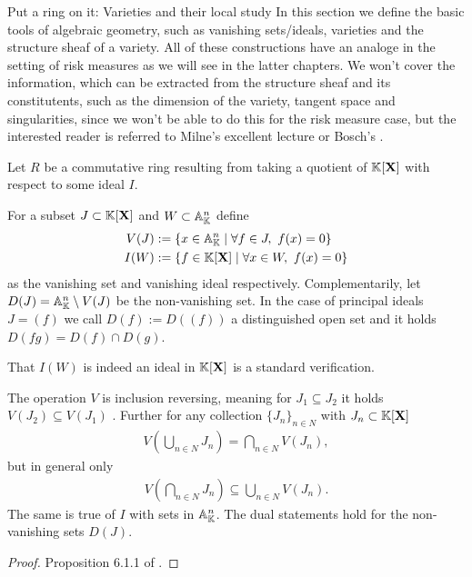 \begin{subsection}{Put a ring on it: Varieties and their local study}
    In this section we define the basic tools of algebraic geometry, such as 
    vanishing sets/ideals, varieties and the structure sheaf of a variety. 
    All of these constructions have an analoge in the setting of risk measures as we will see in the latter chapters.
    We won't cover the information, which can be extracted from the structure sheaf and its constitutents, such as the dimension
    of the variety, tangent space and singularities, since we won't be able to do this for the risk measure case, but the interested
    reader is referred to Milne's excellent lecture \cite{milne2012algebraic} or Bosch's \cite{alggeoandcom}.

    Let \( R \) be a commutative ring resulting from taking a quotient of \( \mathbb{K}[\mathbf{X}] \) with respect to some ideal \( I \).
    \begin{definition}
        For a subset \( J \subset \mathbb{K}[\mathbf{X}] \) and \( W \subset \mathbb{A}^{n}_{\mathbb{K}} \) define
        \begin{align*}
            V(J) &:= \left\{ x \in \stdaff \mid \forall f \in J,\ f(x) = 0 \right\}  \\
            I(W) &:= \left\{ f \in \stdpolyr \mid \forall x \in W,\ f(x) = 0 \right\}
        \end{align*}
        as the vanishing set and vanishing ideal respectively. Complementarily, let
        \( D(J) = \mathbb{A}^{n}_{\mathbb{K}} \setminus V(J) \) be the non-vanishing set. In the case of principal ideals \( J = (f) \)
        we call \( D(f) := D((f)) \) a distinguished open set and it holds \( D(fg) = D(f) \cap D(g) \).
    \end{definition}
    That \( I(W) \) is indeed an ideal in \( \mathbb{K}[\mathbf{X}] \) is a standard verification.
    \begin{proposition}
        The operation \( V \) is inclusion reversing, meaning for \( J_1 \subseteq J_2 \)
        it holds \( V(J_2) \subseteq V(J_1) \) . 
        Further for any collection \( \{J_n\}_{n \in N} \) with \( J_n \subset \mathbb{K}[\mathbf{X}] \)
        \begin{align*}
            V\left(\bigcup_{n \in N} J_n \right) = \bigcap_{n \in N} V\left(J_n \right),
        \end{align*}
        but in general only
        \begin{align*}
            V\left(\bigcap_{n \in N} J_n \right) \subseteq \bigcup_{n \in N} V\left(J_n \right).
        \end{align*}
        The same is true of \( I \) with sets in \( \mathbb{A}^{n}_{\mathbb{K}} \). The dual statements hold for the non-vanishing sets \( D(J) \).
    \end{proposition}
    \begin{proof}
        Proposition 6.1.1 of \cite{alggeoandcom}.
    \end{proof}
    

\end{subsection}
